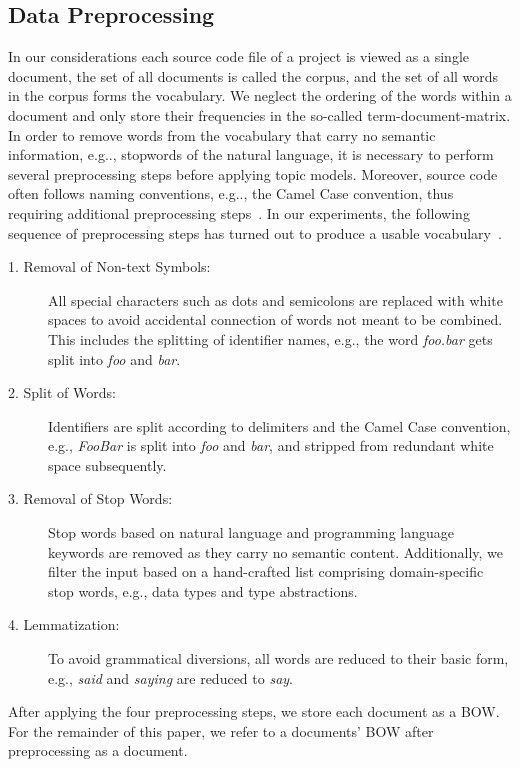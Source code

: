 \documentclass[runningheads]{llncs}
\makeatletter
\DeclareRobustCommand\onedot{\futurelet\@let@token\@onedot}
\def\@onedot{\ifx\@let@token.\else.\null\fi\xspace}
\def\eg{e.g\onedot,\xspace}
\makeatother
\begin{document}
\subsection{Data Preprocessing}
In our considerations each source code file of a project is viewed as a single document, the set of all documents is called the corpus, and the set of all words in the corpus forms the vocabulary.
We neglect the ordering of the words within a document and only store their frequencies in the so-called term-document-matrix.
In order to remove words from the vocabulary that carry no semantic information, \eg stopwords of the natural language, it is necessary to perform several preprocessing steps before applying topic models.
Moreover, source code often follows naming conventions, \eg the Camel Case convention, thus requiring additional preprocessing steps~\cite{chen2016survey}.
In our experiments, the following sequence of preprocessing steps has turned out to produce a usable vocabulary~\cite{atzberger2021softwareforest}.

\begin{description}
    \item [1. Removal of Non-text Symbols:] All special characters such as dots and semicolons are replaced with white spaces to avoid accidental connection of words not meant to be combined.
    This includes the splitting of identifier names, e.g., the word \emph{foo.bar} gets split into \emph{foo} and \emph{bar}.
    \item [2. Split of Words:] Identifiers are split according to delimiters and the Camel Case convention, e.g., \emph{FooBar} is split into \emph{foo} and \emph{bar}, and stripped from redundant white space subsequently. 
    \item [3. Removal of Stop Words:] Stop words based on natural language and programming language keywords are removed as they carry no semantic content. Additionally, we filter the input based on a hand-crafted list comprising domain-specific stop words, e.g., data types and type abstractions.
    \item [4. Lemmatization:] To avoid grammatical diversions, all words are reduced to their basic form, e.g., \emph{said} and \emph{saying} are reduced to \emph{say}.
\end{description}
After applying the four preprocessing steps, we store each document as a \ac{BOW}.
For the remainder of this paper, we refer to a documents' \ac{BOW} after preprocessing as a document.
\end{document}
